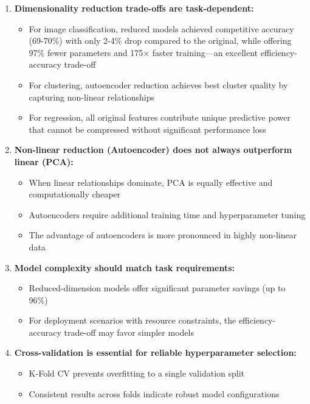 \documentclass[11pt,a4paper]{article}
\begin{document}
\begin{enumerate}
    \item \textbf{Dimensionality reduction trade-offs are task-dependent:}
    \begin{itemize}
        \item For image classification, reduced models achieved competitive accuracy (69-70\%) with only 2-4\% drop compared to the original, while offering 97\% fewer parameters and 175$\times$ faster training---an excellent efficiency-accuracy trade-off
        \item For clustering, autoencoder reduction achieves best cluster quality by capturing non-linear relationships
        \item For regression, all original features contribute unique predictive power that cannot be compressed without significant performance loss
    \end{itemize}
    
    \item \textbf{Non-linear reduction (Autoencoder) does not always outperform linear (PCA):}
    \begin{itemize}
        \item When linear relationships dominate, PCA is equally effective and computationally cheaper
        \item Autoencoders require additional training time and hyperparameter tuning
        \item The advantage of autoencoders is more pronounced in highly non-linear data
    \end{itemize}
    
    \item \textbf{Model complexity should match task requirements:}
    \begin{itemize}
        \item Reduced-dimension models offer significant parameter savings (up to 96\%)
        \item For deployment scenarios with resource constraints, the efficiency-accuracy trade-off may favor simpler models
    \end{itemize}
    
    \item \textbf{Cross-validation is essential for reliable hyperparameter selection:}
    \begin{itemize}
        \item K-Fold CV prevents overfitting to a single validation split
        \item Consistent results across folds indicate robust model configurations
    \end{itemize}
\end{enumerate}
\end{document}
